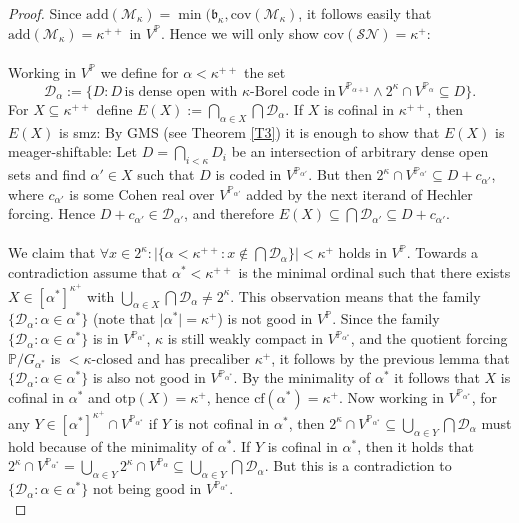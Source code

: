 \documentclass[12pt,a4paper]{scrartcl}
\theoremstyle{definition}
\numberwithin{equation}{section}
\begin{document}
\begin{proof}
Since $\text{add}(\mathcal{M}_\kappa)= \min( \mathfrak{b}_\kappa, \text{cov}(\mathcal{M}_\kappa)$, it follows easily that $\text{add}(\mathcal{M}_\kappa)=\kappa^{++}$ in $V^{\mathbb{P}}$.
Hence we will only show $\text{cov}(\mathcal{SN})= \kappa^+$:\\
\\
Working in $V^{\mathbb{P}}$ we define for $\alpha < \kappa^{++}$  the set $$\mathcal{D}_\alpha:=\{D \colon D \, \text{is dense open with} \,\, \kappa\text{-Borel code in} \, V^{\mathbb{P}_{\alpha+1}} \land 2^\kappa \cap V^{\mathbb{P}_\alpha} \subseteq D\}.$$
For $X\subseteq \kappa^{++}$ define $E(X):= \bigcap_{\alpha \in X} \bigcap \mathcal{D}_\alpha$. If $X$ is cofinal in $\kappa^{++}$, then $E(X)$ is smz: By GMS (see Theorem \ref{T3}) it is enough to show that $E(X)$ is meager-shiftable: Let $D=\bigcap_{i<\kappa} D_i$ be an intersection of arbitrary dense open sets and find $\alpha' \in X$ such that $D$ is coded in $V^{\mathbb{P}_{\alpha'}}$. But then $2^\kappa \cap V^{\mathbb{P}_{\alpha'}} \subseteq D + c_{\alpha'}$, where $c_{\alpha'}$ is some Cohen real over $V^{\mathbb{P}_{\alpha'}}$ added by the next iterand of Hechler forcing. Hence $D + c_{\alpha'} \in \mathcal{D}_{\alpha'}$, and therefore $E(X) \subseteq \bigcap \mathcal{D}_{\alpha'} \subseteq D + c_{\alpha'}$.\\
\\
We claim that $\forall x \in 2^\kappa \colon \vert \{\alpha < \kappa^{++} \colon x \notin \bigcap \mathcal{D}_\alpha\} \vert < \kappa^+$ holds in $V^{\mathbb{P}}$. Towards a contradiction assume that $\alpha^* < \kappa^{++}$ is the minimal ordinal such that there exists $X \in [\alpha^*]^{\kappa^+}$ with $\bigcup_{\alpha \in X} \bigcap \mathcal{D}_\alpha \neq 2^\kappa$. This observation means that the family $\{\mathcal{D}_\alpha \colon \alpha \in \alpha^*\}$ (note that $\vert \alpha^* \vert= \kappa^+$) is not good in $V^{\mathbb{P}}$. Since the family $\{\mathcal{D}_\alpha \colon \alpha \in \alpha^*\}$ is in $V^{\mathbb{P}_{\alpha^*}}$, $\kappa$ is still weakly compact in   $V^{\mathbb{P}_{\alpha^*}}$, and the quotient forcing $\mathbb{P}/G_{\alpha^*}$ is ${<}\kappa$-closed and has precaliber $\kappa^+$, it follows by the previous lemma that $\{\mathcal{D}_\alpha \colon \alpha \in \alpha^*\}$ is also not good in $V^{\mathbb{P}_{\alpha^*}}$. By the minimality of $\alpha^*$ it follows that $X$ is cofinal in $\alpha^*$ and $\text{otp}(X)= \kappa^+$, hence $\text{cf}(\alpha^*)=\kappa^+$. Now working in $V^{\mathbb{P}_{\alpha^*}}$, for any $Y \in [\alpha^*]^{\kappa^+}\cap V^{\mathbb{P}_{\alpha^*}}$ if $Y$ is not cofinal in $\alpha^*$, then $2^\kappa \cap V^{\mathbb{P}_{\alpha^*}} \subseteq \bigcup_{\alpha \in Y} \bigcap \mathcal{D}_\alpha$ must hold because of the minimality of $\alpha^*$. If $Y$ is cofinal in $\alpha^*$, then it holds that $2^\kappa \cap V^{\mathbb{P}_{\alpha^*}} = \bigcup_{\alpha \in Y} 2^\kappa \cap V^{\mathbb{P}_{\alpha}} \subseteq \bigcup_{\alpha \in Y} \bigcap \mathcal{D}_\alpha$. But this is a contradiction to $\{\mathcal{D}_\alpha \colon \alpha \in \alpha^*\}$ not being good in $V^{\mathbb{P}_{\alpha^*}}$.\\

\end{proof}
\end{document}
